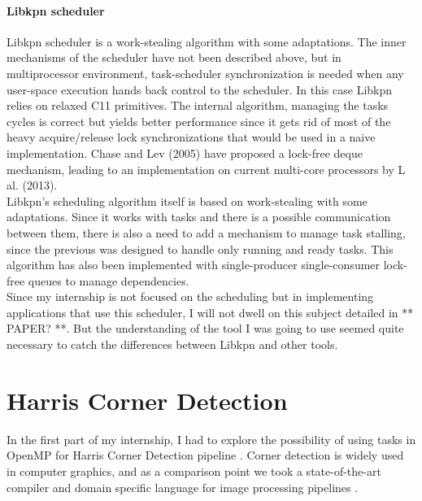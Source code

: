 \documentclass[a4paper,11pt]{article}
\begin{document}
\paragraph{Libkpn scheduler} Libkpn scheduler is a work-stealing algorithm with some adaptations. 
The inner mechanisms of the scheduler have not been described above, but in multiprocessor 
environment, task-scheduler synchronization is needed when any user-space
execution hands back control to the scheduler. In this case Libkpn relies on relaxed C11
primitives. The internal algorithm, managing the tasks cycles is correct but yields better
performance since it gets rid of most of the heavy acquire/release lock synchronizations
that would be used in a naive implementation. Chase and Lev (2005) have proposed a
lock-free deque mechanism, leading to an implementation on current multi-core processors
by L al. (2013). \\
Libkpn’s scheduling algorithm itself is based on work-stealing with some adaptations.
Since it works with tasks and there is a possible communication between them, there is
also a need to add a mechanism to manage task stalling, since the previous was designed
to handle only running and ready tasks. This algorithm has also been implemented with
single-producer single-consumer lock-free queues to manage dependencies.\\
Since my internship is not focused on the scheduling but in implementing applications
that use this scheduler, I will not dwell on this subject detailed in ** PAPER? **. But
the understanding of the tool I was going to use seemed quite necessary to catch the
differences between Libkpn and other tools.


\section{Harris Corner Detection}
In the first part of my internship, I had to explore the possibility of using tasks in OpenMP
for Harris Corner Detection pipeline \cite{harris1988combined}. Corner detection is widely used 
in computer graphics, and as a comparison point we took a state-of-the-art compiler and domain 
specific language for image processing pipelines \cite{mullapudi_polymage_2015}.
\end{document}

